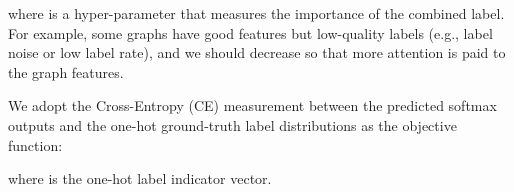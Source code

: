\documentclass[sigconf]{acmart}
\begin{document}
where  is a hyper-parameter that measures the importance of the combined label. For example, some graphs have good features but low-quality labels (e.g., label noise or low label rate), and we should decrease  so that more attention is paid to the graph features.

We adopt the Cross-Entropy (CE) measurement between the predicted softmax outputs and the one-hot ground-truth label distributions as the objective function: 

where  is the one-hot label indicator vector.




\begin{table*}[tpb]
\caption{Algorithm analysis for existing scalable GNNs.  , , , and  are the number of nodes, edges, classes,  and feature dimensions, respectively.  is the batch size, and  refers to the number of sampled nodes.  and  corresponds to the number of times we aggregate features and labels, respectively. Besides,  and  are the number of layers in MLP classifiers trained with features and labels, respectively.} 
    \centering
    
    \label{algorithm analysis}
\end{table*}
\end{document}
